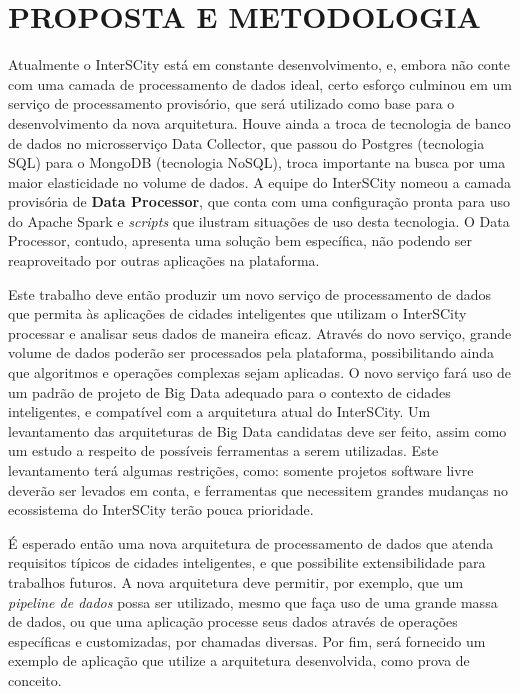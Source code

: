 \section{PROPOSTA E METODOLOGIA}

Atualmente o InterSCity está em constante desenvolvimento, e, embora não conte
com uma camada de processamento de dados ideal, certo esforço culminou em um
serviço de processamento provisório, que será utilizado como base para o
desenvolvimento da nova arquitetura. Houve ainda a troca de tecnologia de banco
de dados no microsserviço Data Collector, que passou do Postgres (tecnologia
SQL) para o MongoDB (tecnologia NoSQL), troca importante na busca por uma maior
elasticidade no volume de dados. A equipe do InterSCity nomeou a camada
provisória de \textbf{Data Processor}, que conta com uma configuração pronta
para uso do Apache Spark e \textit{scripts} que ilustram situações de uso desta
tecnologia. O Data Processor, contudo, apresenta uma solução bem específica,
não podendo ser reaproveitado por outras aplicações na plataforma.

Este trabalho deve então produzir um novo serviço de processamento de dados que
permita às aplicações de cidades inteligentes que utilizam o InterSCity
processar e analisar seus dados de maneira eficaz. Através do novo serviço,
grande volume de dados poderão ser processados pela plataforma, possibilitando
ainda que algoritmos e operações complexas sejam aplicadas. O novo serviço fará
uso de um padrão de projeto de Big Data adequado para o contexto de cidades
inteligentes, e compatível com a arquitetura atual do InterSCity. Um
levantamento das arquiteturas de Big Data candidatas deve ser feito, assim
como um estudo a respeito de possíveis ferramentas a serem utilizadas. Este
levantamento terá algumas restrições, como: somente projetos software livre
deverão ser levados em conta, e ferramentas que necessitem grandes mudanças no
ecossistema do InterSCity terão pouca prioridade.

É esperado então uma nova arquitetura de processamento de dados que atenda
requisitos típicos de cidades inteligentes, e que possibilite extensibilidade
para trabalhos futuros. A nova arquitetura deve permitir, por exemplo, que um
\textit{pipeline de dados} possa ser utilizado, mesmo que faça uso de uma
grande massa de dados, ou que uma aplicação processe seus dados através de
operações específicas e customizadas, por chamadas diversas. Por fim, será
fornecido um exemplo de aplicação que utilize a arquitetura desenvolvida, como
prova de conceito.
